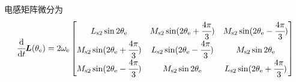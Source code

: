 电感矩阵微分为
\begin{equation}
    \cfrac{\mathrm{d}}{\mathrm{d} t}\bm{L}(\theta_{\mathrm{e}})
    =2\omega_{\mathrm{e}}
    \begin{bmatrix}
        L_{\mathrm{s}2}\sin2\theta_{\mathrm{e}}
        &M_{\mathrm{s}2}\sin(2\theta_{\mathrm{e}}+\cfrac{4\pi}{3})
        &M_{\mathrm{s}2}\sin(2\theta_{\mathrm{e}}-\cfrac{4\pi}{3})
        \\
        M_{\mathrm{s}2}\sin(2\theta_{\mathrm{e}}+\cfrac{4\pi}{3})
        &L_{\mathrm{s}2}\sin(2\theta_{\mathrm{e}}-\cfrac{4\pi}{3})
        &M_{\mathrm{s}2}\sin2\theta_{\mathrm{e}}
        \\
        M_{\mathrm{s}2}\sin(2\theta_{\mathrm{e}}-\cfrac{4\pi}{3})
        &M_{\mathrm{s}2}\sin2\theta_{\mathrm{e}}
        &L_{\mathrm{s}2}\sin(2\theta_{\mathrm{e}}+\cfrac{4\pi}{3})
    \end{bmatrix}
    \label{eq:电感矩阵微分}
\end{equation}

